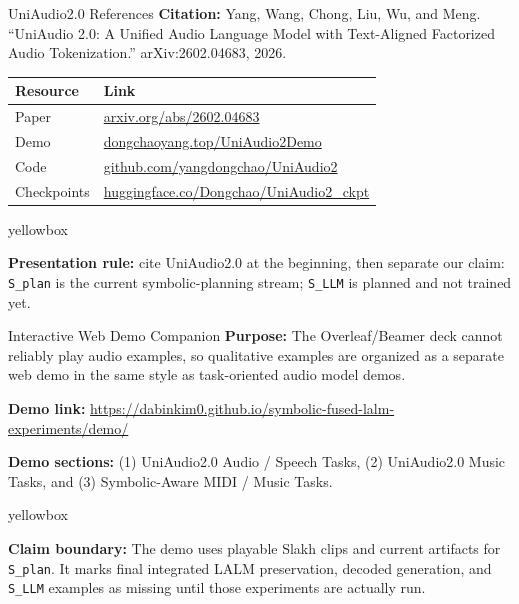 \documentclass[aspectratio=169,11pt]{beamer}
\newcommand{\code}[1]{\texttt{\footnotesize #1}}
\newcommand{\expfield}[2]{\textbf{#1:} #2\par\vspace{0.10cm}}
\newenvironment{keybox}{%
  \begin{beamercolorbox}[rounded=true,sep=0.14cm,wd=\linewidth]{yellowbox}\footnotesize%
}{%
  \end{beamercolorbox}%
}
\begin{document}
\begin{frame}{UniAudio2.0 References}
  \footnotesize
  \expfield{Citation}{Yang, Wang, Chong, Liu, Wu, and Meng. ``UniAudio 2.0: A Unified Audio Language Model with Text-Aligned Factorized Audio Tokenization.'' arXiv:2602.04683, 2026.}

  \begin{tabularx}{\linewidth}{p{2.6cm}Y}
    \toprule
    Resource & Link \\
    \midrule
    Paper & \href{https://arxiv.org/abs/2602.04683}{arxiv.org/abs/2602.04683} \\
    Demo & \href{https://dongchaoyang.top/UniAudio2Demo/}{dongchaoyang.top/UniAudio2Demo} \\
    Code & \href{https://github.com/yangdongchao/UniAudio2}{github.com/yangdongchao/UniAudio2} \\
    Checkpoints & \href{https://huggingface.co/Dongchao/UniAudio2_ckpt}{huggingface.co/Dongchao/UniAudio2\_ckpt} \\
    \bottomrule
  \end{tabularx}

  \vspace{0.22cm}
  \begin{keybox}
    \textbf{Presentation rule:} cite UniAudio2.0 at the beginning, then separate our claim: \code{S\_plan} is the current symbolic-planning stream; \code{S\_LLM} is planned and not trained yet.
  \end{keybox}
\end{frame}

\begin{frame}{Interactive Web Demo Companion}
  \footnotesize
  \expfield{Purpose}{The Overleaf/Beamer deck cannot reliably play audio examples, so qualitative examples are organized as a separate web demo in the same style as task-oriented audio model demos.}
  \expfield{Demo link}{\href{https://dabinkim0.github.io/symbolic-fused-lalm-experiments/demo/}{https://dabinkim0.github.io/symbolic-fused-lalm-experiments/demo/}}
  \expfield{Demo sections}{(1) UniAudio2.0 Audio / Speech Tasks, (2) UniAudio2.0 Music Tasks, and (3) Symbolic-Aware MIDI / Music Tasks.}
  \begin{keybox}
    \textbf{Claim boundary:} The demo uses playable Slakh clips and current artifacts for \code{S\_plan}. It marks final integrated LALM preservation, decoded generation, and \code{S\_LLM} examples as missing until those experiments are actually run.
  \end{keybox}
\end{frame}
\end{document}
